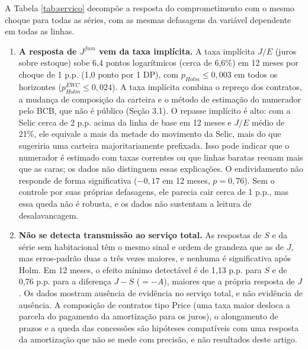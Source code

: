 \documentclass[12pt,a4paper]{article}
\begin{document}
A Tabela \ref{tab:servico} decompõe a resposta do comprometimento com o mesmo choque para todas as séries, com as mesmas defasagens da variável dependente em todas as linhas.
\begin{enumerate}
    \item \textbf{A resposta de $J^{fam}$ vem da taxa implícita.} A taxa implícita $J/E$ (juros sobre estoque) sobe 6,4 pontos logarítmicos (cerca de 6,6\%) em 12 meses por choque de 1 p.p. (1,0 ponto por 1 DP), com $p_{Holm} \le 0{,}003$ em todos os horizontes ($p_{Holm}^{EWC} \le 0{,}024$). A taxa implícita combina o repreço dos contratos, a mudança de composição da carteira e o método de estimação do numerador pelo BCB, que não é público (Seção 3.1). O repasse implícito é alto: com a Selic cerca de 2 p.p. acima da linha de base em 12 meses e $J/E$ médio de 21\%, ele equivale a mais da metade do movimento da Selic, mais do que sugeriria uma carteira majoritariamente prefixada. Isso pode indicar que o numerador é estimado com taxas correntes ou que linhas baratas recuam mais que as caras; os dados não distinguem essas explicações. O endividamento não responde de forma significativa ($-0{,}17$ em 12 meses, $p = 0{,}76$). Sem o controle por suas próprias defasagens, ele parecia cair cerca de 1 p.p., mas essa queda não é robusta, e os dados não sustentam a leitura de desalavancagem.
    \item \textbf{Não se detecta transmissão ao serviço total.} As respostas de $S$ e da série sem habitacional têm o mesmo sinal e ordem de grandeza que as de $J$, mas erros-padrão duas a três vezes maiores, e nenhuma é significativa após Holm. Em 12 meses, o efeito mínimo detectável é de 1,13 p.p. para $S$ e de 0,76 p.p. para a diferença $J - S$ ($= -A$), maiores que a própria resposta de $J$. Os dados mostram ausência de evidência no serviço total, e não evidência de ausência. A composição de contratos tipo Price (uma taxa maior desloca a parcela do pagamento da amortização para os juros), o alongamento de prazos e a queda das concessões são hipóteses compatíveis com uma resposta da amortização que não se mede com precisão, e não resultados deste artigo.

\end{enumerate}
\end{document}
